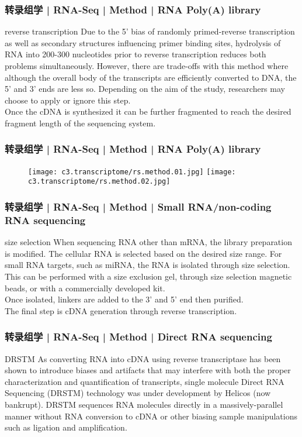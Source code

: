 \begin{frame}
  \frametitle{转录组学 | RNA-Seq | Method | RNA Poly(A) library}
  \begin{block}{reverse transcription}
 Due to the 5' bias of randomly primed-reverse transcription as well as secondary structures influencing primer binding sites, hydrolysis of RNA into 200-300 nucleotides prior to reverse transcription reduces both problems simultaneously. However, there are trade-offs with this method where although the overall body of the transcripts are efficiently converted to DNA, the 5' and 3' ends are less so. Depending on the aim of the study, researchers may choose to apply or ignore this step.\\
 \vspace{1em}
    Once the cDNA is synthesized it can be further fragmented to reach the desired fragment length of the sequencing system.
  \end{block}
\end{frame}

\begin{frame}
  \frametitle{转录组学 | RNA-Seq | Method | RNA Poly(A) library}
  \begin{figure}
    \centering
    \texttt{[image: c3.transcriptome/rs.method.01.jpg]}
    \texttt{[image: c3.transcriptome/rs.method.02.jpg]}
  \end{figure}
\end{frame}

\begin{frame}
  \frametitle{转录组学 | RNA-Seq | Method | Small RNA/non-coding RNA sequencing}
  \begin{block}{size selection}
 When sequencing RNA other than mRNA, the library preparation is modified. The cellular RNA is selected based on the desired size range. For small RNA targets, such as miRNA, the RNA is isolated through size selection. This can be performed with a size exclusion gel, through size selection magnetic beads, or with a commercially developed kit.\\
 \vspace{1em}
 Once isolated, linkers are added to the 3' and 5' end then purified.\\
 \vspace{1em}
 The final step is cDNA generation through reverse transcription. 
  \end{block}
\end{frame}

\begin{frame}
  \frametitle{转录组学 | RNA-Seq | Method | Direct RNA sequencing}
  \begin{block}{DRSTM}
  As converting RNA into cDNA using reverse transcriptase has been shown to introduce biases and artifacts that may interfere with both the proper characterization and quantification of transcripts, single molecule Direct RNA Sequencing (DRSTM) technology was under development by Helicos (now bankrupt). DRSTM sequences RNA molecules directly in a massively-parallel manner without RNA conversion to cDNA or other biasing sample manipulations such as ligation and amplification.
  \end{block}
\end{frame}

